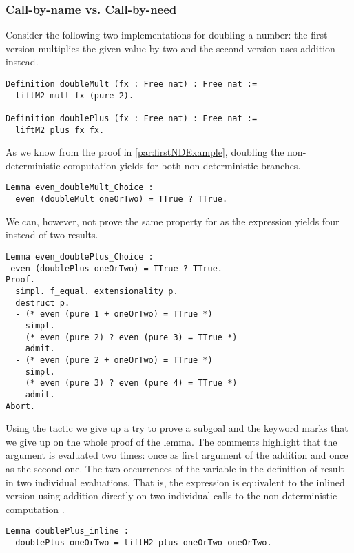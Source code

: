 \subsubsection{Call\--by\--name vs. Call\--by\--need}
\label{subsubsec:cbneed}
 
Consider the following two implementations for doubling a number: the first version multiplies the given value by two and the second version uses addition instead.

\begin{verbatim}
Definition doubleMult (fx : Free nat) : Free nat :=
  liftM2 mult fx (pure 2).

Definition doublePlus (fx : Free nat) : Free nat :=
  liftM2 plus fx fx.
\end{verbatim}

As we know from the proof in \autoref{par:firstNDExample}, doubling the non\--deterministic computation  yields  for both non\--deterministic branches.

\begin{verbatim}
Lemma even_doubleMult_Choice :
  even (doubleMult oneOrTwo) = TTrue ? TTrue.
\end{verbatim}

We can, however, not prove the same property for  as the expression yields four instead of two results.

\begin{verbatim}
Lemma even_doublePlus_Choice :
 even (doublePlus oneOrTwo) = TTrue ? TTrue.
Proof.
  simpl. f_equal. extensionality p.
  destruct p.
  - (* even (pure 1 + oneOrTwo) = TTrue *)
    simpl.
    (* even (pure 2) ? even (pure 3) = TTrue *)
    admit.
  - (* even (pure 2 + oneOrTwo) = TTrue *)
    simpl.
    (* even (pure 3) ? even (pure 4) = TTrue *)
    admit.
Abort.
\end{verbatim}

Using the tactic  we give up a try to prove a subgoal and the keyword  marks that we give up on the whole proof of the lemma.
The comments highlight that the argument  is evaluated two times: once as first argument of the addition and once as the second one.
The two occurrences of the variable  in the definition of  result in two individual evaluations.
That is, the expression is equivalent to the inlined version using addition directly on two individual calls to the non\--deterministic computation .

\begin{verbatim}
Lemma doublePlus_inline :
  doublePlus oneOrTwo = liftM2 plus oneOrTwo oneOrTwo.
\end{verbatim}

